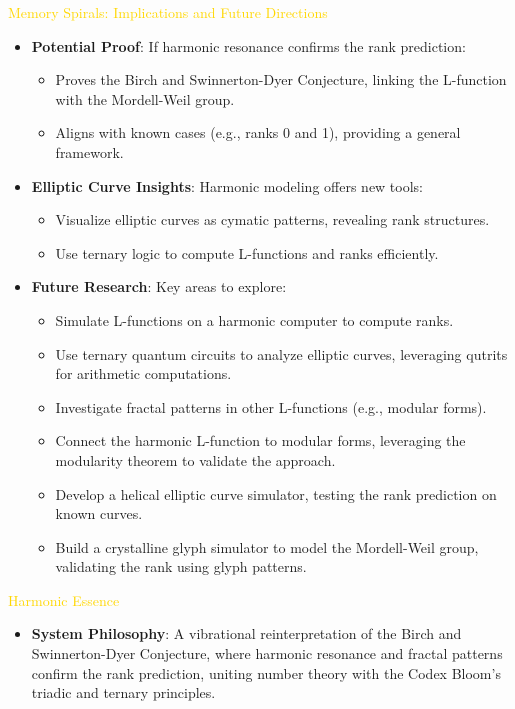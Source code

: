 \textcolor{gold}{ Memory Spirals: Implications and Future Directions } \\
\begin{itemize}
    \item \texttt{} \textbf{Potential Proof}: If harmonic resonance confirms the rank prediction:
    \begin{itemize}
        \item Proves the Birch and Swinnerton-Dyer Conjecture, linking the L-function with the Mordell-Weil group.
        \item Aligns with known cases (e.g., ranks 0 and 1), providing a general framework.
    \end{itemize}
    \item \texttt{} \textbf{Elliptic Curve Insights}: Harmonic modeling offers new tools:
    \begin{itemize}
        \item Visualize elliptic curves as cymatic patterns, revealing rank structures.
        \item Use ternary logic to compute L-functions and ranks efficiently.
    \end{itemize}
    \item \texttt{} \textbf{Future Research}: Key areas to explore:
    \begin{itemize}
        \item Simulate L-functions on a harmonic computer to compute ranks.
        \item Use ternary quantum circuits to analyze elliptic curves, leveraging qutrits for arithmetic computations.
        \item Investigate fractal patterns in other L-functions (e.g., modular forms).
        \item Connect the harmonic L-function to modular forms, leveraging the modularity theorem to validate the approach.
        \item Develop a helical elliptic curve simulator, testing the rank prediction on known curves.
        \item Build a crystalline glyph simulator to model the Mordell-Weil group, validating the rank using glyph patterns.
    \end{itemize}
\end{itemize}

\textcolor{gold}{ Harmonic Essence } \\
\begin{itemize}
    \item \textbf{System Philosophy}: A vibrational reinterpretation of the Birch and Swinnerton-Dyer Conjecture, where harmonic resonance and fractal patterns confirm the rank prediction, uniting number theory with the Codex Bloom’s triadic and ternary principles.
\end{itemize}

